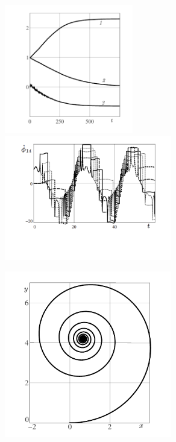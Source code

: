 \begin{figure}[H]
  \hspace{-1.4cm}
  \includegraphics[width=0.5\textwidth]{pic/figure7_1.pdf}
  \hspace{-0.7cm}
  \includegraphics[width=0.65\textwidth]{pic/figure7_2.png}
  \begin{center}
  \includegraphics[width=0.65\textwidth]{pic/figure7_3.pdf}
  \end{center}
  \caption{\ }
  \label{fig:wrench}
\end{figure}


%

%

%